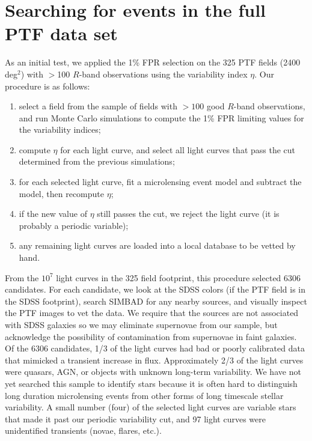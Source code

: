 \documentclass[12pt,preprint]{aastex}
\newcommand{\apwsim}{\raisebox{0.2ex}{\scriptsize$\sim$\normalsize}}
\begin{document}
\section{Searching for events in the full PTF data set}
As an initial test, we applied the 1\% FPR selection on the 325 PTF fields (\apwsim2400 deg$^2$) with $>$100 $R$-band observations using the variability index $\eta$. Our procedure is as follows:
\begin{enumerate}
	\item select a field from the sample of fields with $>100$ good $R$-band observations, and run Monte Carlo simulations to compute the 1\% FPR limiting values for the variability indices;
	\item compute $\eta$ for each light curve, and select all light curves that pass the cut determined from the previous simulations;
	\item for each selected light curve, fit a microlensing event model and subtract the model, then recompute $\eta$;
	\item if the new value of $\eta$ still passes the cut, we reject the light curve (it is probably a periodic variable);
	\item any remaining light curves are loaded into a local database to be vetted by hand.
\end{enumerate}

From the \apwsim$10^7$ light curves in the 325 field footprint, this procedure selected 6306 candidates. For each candidate, we look at the SDSS colors (if the PTF field is in the SDSS footprint), search SIMBAD for any nearby sources, and visually inspect the PTF images to vet the data. We require that the sources are not associated with SDSS galaxies so we may eliminate supernovae from our sample, but acknowledge the possibility of contamination from supernovae in faint galaxies. Of the 6306 candidates, \apwsim1/3 of the light curves had bad or poorly calibrated data that mimicked a transient increase in flux. Approximately 2/3 of the light curves were quasars, AGN, or objects with unknown long-term variability. We have not yet searched this sample to identify stars because it is often hard to distinguish long duration microlensing events from other forms of long timescale stellar variability. A small number (four) of the selected light curves are variable stars that made it past our periodic variability cut, and 97 light curves were unidentified transients (novae, flares, etc.). 
\end{document}
